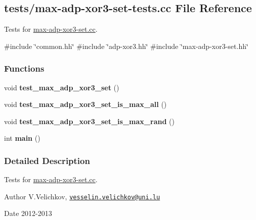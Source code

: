 \hypertarget{max-adp-xor3-set-tests_8cc}{\subsection{tests/max-\/adp-\/xor3-\/set-\/tests.cc \-File \-Reference}
\label{max-adp-xor3-set-tests_8cc}
}


\-Tests for \hyperlink{max-adp-xor3-set_8cc}{max-\/adp-\/xor3-\/set.\-cc}.  


{\ttfamily \#include \char`\"{}common.\-hh\char`\"{}}\*
{\ttfamily \#include \char`\"{}adp-\/xor3.\-hh\char`\"{}}\*
{\ttfamily \#include \char`\"{}max-\/adp-\/xor3-\/set.\-hh\char`\"{}}\*
\subsubsection*{\-Functions}
\begin{DoxyCompactItemize}
\item 
\hypertarget{max-adp-xor3-set-tests_8cc_aca077e18419a3927d20cf1c3e4b38cf8}{void {\bfseries test\-\_\-max\-\_\-adp\-\_\-xor3\-\_\-set} ()}\label{max-adp-xor3-set-tests_8cc_aca077e18419a3927d20cf1c3e4b38cf8}

\item 
\hypertarget{max-adp-xor3-set-tests_8cc_a7353ae55629b16d3410a9b818631b5e9}{void {\bfseries test\-\_\-max\-\_\-adp\-\_\-xor3\-\_\-set\-\_\-is\-\_\-max\-\_\-all} ()}\label{max-adp-xor3-set-tests_8cc_a7353ae55629b16d3410a9b818631b5e9}

\item 
\hypertarget{max-adp-xor3-set-tests_8cc_a0b81cc1854182404c82cca4383a434d0}{void {\bfseries test\-\_\-max\-\_\-adp\-\_\-xor3\-\_\-set\-\_\-is\-\_\-max\-\_\-rand} ()}\label{max-adp-xor3-set-tests_8cc_a0b81cc1854182404c82cca4383a434d0}

\item 
\hypertarget{max-adp-xor3-set-tests_8cc_ae66f6b31b5ad750f1fe042a706a4e3d4}{int {\bfseries main} ()}\label{max-adp-xor3-set-tests_8cc_ae66f6b31b5ad750f1fe042a706a4e3d4}

\end{DoxyCompactItemize}


\subsubsection{\-Detailed \-Description}
\-Tests for \hyperlink{max-adp-xor3-set_8cc}{max-\/adp-\/xor3-\/set.\-cc}. \begin{DoxyAuthor}{\-Author}
\-V.\-Velichkov, \href{mailto:vesselin.velichkov@uni.lu}{\tt vesselin.\-velichkov@uni.\-lu} 
\end{DoxyAuthor}
\begin{DoxyDate}{\-Date}
2012-\/2013 
\end{DoxyDate}
